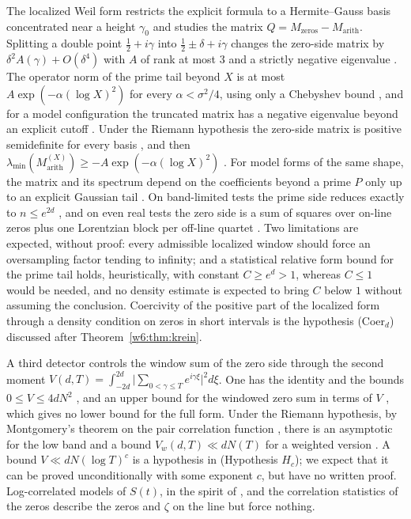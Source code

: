 \documentclass[11pt]{amsart}
\theoremstyle{definition}
\theoremstyle{remark}
\numberwithin{equation}{section}
\begin{document}
The localized Weil form restricts the explicit formula to a Hermite--Gauss basis concentrated near
a height $\gamma_0$ and studies the matrix $Q=M_{\mathrm{zeros}}-M_{\mathrm{arith}}$. Splitting a
double point $\frac12+i\gamma$ into $\frac12\pm\delta+i\gamma$ changes the zero-side matrix by
$\delta^2A(\gamma)+O(\delta^4)$ with $A$ of rank at most $3$ and a strictly negative eigenvalue
\cite[Lemma~3.1 and Theorem~3.2]{P07}. The operator norm of the prime tail beyond $X$ is at most
$A\exp(-\alpha(\log X)^2)$ for every $\alpha<\sigma^2/4$, using only a Chebyshev bound
\cite[Theorem~4.2]{P07}, and for a model configuration the truncated matrix has a negative
eigenvalue beyond an explicit cutoff \cite[Theorem~5.1]{P07}. Under the Riemann hypothesis the
zero-side matrix is positive semidefinite for every basis \cite[Proposition~6.1(b)]{P07}, and then
$\lambda_{\min}(M^{(X)}_{\mathrm{arith}})\ge-A\exp(-\alpha(\log X)^2)$ \cite[Corollary~6.2]{P07}.
For model forms of the same shape, the matrix and its spectrum depend on the coefficients beyond a
prime $P$ only up to an explicit Gaussian tail \cite[Theorem~4.1]{P09}. On band-limited tests the
prime side reduces exactly to $n\le e^{2d}$ \cite[Proposition~2.1]{P12}, and on even real tests the
zero side is a sum of squares over on-line zeros plus one Lorentzian block per off-line quartet
\cite[Theorem~3.1]{P18}. Two limitations are expected, without proof: every admissible localized
window should force an oversampling factor tending to infinity; and a statistical relative form
bound for the prime tail holds, heuristically, with constant $C\ge e^{d}>1$, whereas $C\le1$ would
be needed, and no density estimate is expected to bring $C$ below $1$ without assuming the
conclusion. Coercivity of the positive part of the localized form through a density condition on
zeros in short intervals is the hypothesis (Coer$_d$) discussed after
Theorem~\ref{w6:thm:krein}.

A third detector controls the window sum of the zero side through the second moment
$V(d,T)=\int_{-2d}^{2d}\bigl|\sum_{0<\gamma\le T}e^{i\gamma\xi}\bigr|^2d\xi$. One has the
identity and the bounds $0\le V\le4dN^2$ \cite[Theorem~2.1]{P16}, and an upper bound for the
windowed zero sum in terms of $V$ \cite[Proposition~2.2]{P16}, which gives no lower bound for the
full form. Under the Riemann hypothesis, by Montgomery's theorem on the pair correlation function
\cite{Montgomery1973}, there is an asymptotic for the low band and a bound $V_w(d,T)\ll dN(T)$ for
a weighted version \cite[Propositions~3.1 and 4.1]{P16}. A bound $V\ll dN(\log T)^c$ is a
hypothesis in \cite{P16} (Hypothesis $H_c$); we expect that it can be proved unconditionally with
some exponent $c$, but have no written proof. Log-correlated models of $S(t)$, in the spirit of
\cite{Selberg1946,KeatingSnaith2000}, and the correlation statistics of the zeros
\cite{RudnickSarnak1996} describe the zeros and $\zeta$ on the line but force nothing.
\end{document}
